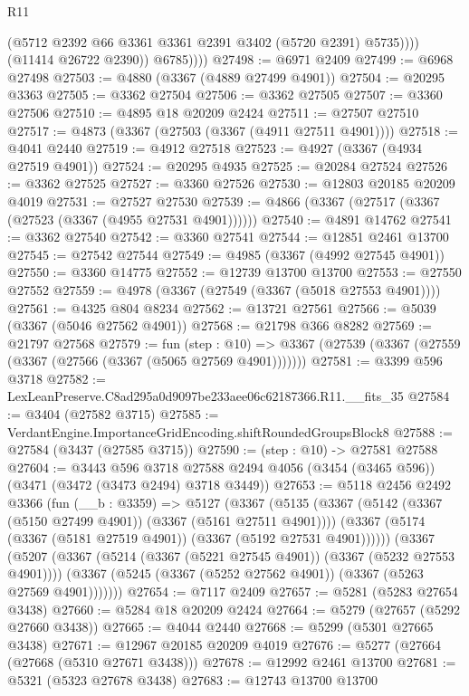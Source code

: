 \begin{lexlean}{R11}
\begin{coremodule}
                    (@5712 @2392 @66 @3361 @3361 @2391 @3402 (@5720 @2391) @5735))))
              (@11414 @26722 @2390))
            @6785))))
@27498 := @6971 @2409
@27499 := @6968 @27498
@27503 := @4880 (@3367 (@4889 @27499 @4901))
@27504 := @20295 @3363
@27505 := @3362 @27504
@27506 := @3362 @27505
@27507 := @3360 @27506
@27510 := @4895 @18 @20209 @2424
@27511 := @27507 @27510
@27517 := @4873 (@3367 (@27503 (@3367 (@4911 @27511 @4901))))
@27518 := @4041 @2440
@27519 := @4912 @27518
@27523 := @4927 (@3367 (@4934 @27519 @4901))
@27524 := @20295 @4935
@27525 := @20284 @27524
@27526 := @3362 @27525
@27527 := @3360 @27526
@27530 := @12803 @20185 @20209 @4019
@27531 := @27527 @27530
@27539 := @4866 (@3367 (@27517 (@3367 (@27523 (@3367 (@4955 @27531 @4901))))))
@27540 := @4891 @14762
@27541 := @3362 @27540
@27542 := @3360 @27541
@27544 := @12851 @2461 @13700
@27545 := @27542 @27544
@27549 := @4985 (@3367 (@4992 @27545 @4901))
@27550 := @3360 @14775
@27552 := @12739 @13700 @13700
@27553 := @27550 @27552
@27559 := @4978 (@3367 (@27549 (@3367 (@5018 @27553 @4901))))
@27561 := @4325 @804 @8234
@27562 := @13721 @27561
@27566 := @5039 (@3367 (@5046 @27562 @4901))
@27568 := @21798 @366 @8282
@27569 := @21797 @27568
@27579 := fun (step : @10) =>
  @3367 (@27539 (@3367 (@27559 (@3367 (@27566 (@3367 (@5065 @27569 @4901)))))))
@27581 := @3399 @596 @3718
@27582 := LexLeanPreserve.C8ad295a0d9097be233aee06c62187366.R11.__fits_35
@27584 := @3404 (@27582 @3715)
@27585 := VerdantEngine.ImportanceGridEncoding.shiftRoundedGroupsBlock8
@27588 := @27584 (@3437 (@27585 @3715))
@27590 := (step : @10) -> @27581 @27588
@27604 := @3443
    @596
    @3718
    @27588
    @2494
    @4056
    (@3454 (@3465 @596))
    (@3471 (@3472 (@3473 @2494) @3718 @3449))
@27653 := @5118
    @2456
    @2492
    @3366
    (fun (__b : @3359) =>
    @5127
      (@3367
        (@5135
          (@3367 (@5142 (@3367 (@5150 @27499 @4901)) (@3367 (@5161 @27511 @4901))))
          (@3367 (@5174 (@3367 (@5181 @27519 @4901)) (@3367 (@5192 @27531 @4901))))))
      (@3367
        (@5207
          (@3367 (@5214 (@3367 (@5221 @27545 @4901)) (@3367 (@5232 @27553 @4901))))
          (@3367 (@5245 (@3367 (@5252 @27562 @4901)) (@3367 (@5263 @27569 @4901)))))))
@27654 := @7117 @2409
@27657 := @5281 (@5283 @27654 @3438)
@27660 := @5284 @18 @20209 @2424
@27664 := @5279 (@27657 (@5292 @27660 @3438))
@27665 := @4044 @2440
@27668 := @5299 (@5301 @27665 @3438)
@27671 := @12967 @20185 @20209 @4019
@27676 := @5277 (@27664 (@27668 (@5310 @27671 @3438)))
@27678 := @12992 @2461 @13700
@27681 := @5321 (@5323 @27678 @3438)
@27683 := @12743 @13700 @13700

\end{coremodule}
\end{lexlean}
